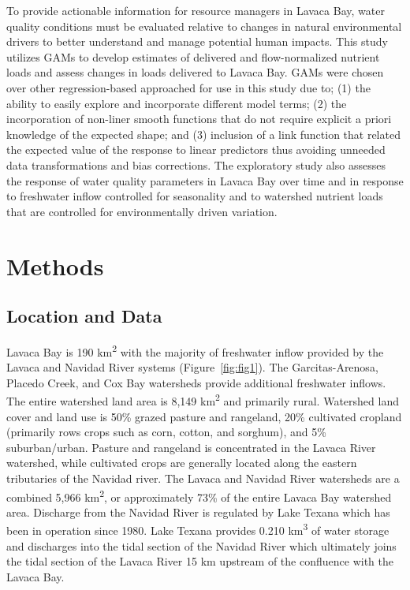 \documentclass[sn-basic,referee,lineno,pdflatex]{sn-jnl}
\begin{document}
To provide actionable information for resource managers in Lavaca Bay,
water quality conditions must be evaluated relative to changes in
natural environmental drivers to better understand and manage potential
human impacts. This study utilizes GAMs to develop estimates of
delivered and flow-normalized nutrient loads and assess changes in loads
delivered to Lavaca Bay. GAMs were chosen over other regression-based
approached for use in this study due to; (1) the ability to easily
explore and incorporate different model terms; (2) the incorporation of
non-liner smooth functions that do not require explicit a priori
knowledge of the expected shape; and (3) inclusion of a link function
that related the expected value of the response to linear predictors
thus avoiding unneeded data transformations and bias corrections. The
exploratory study also assesses the response of water quality parameters
in Lavaca Bay over time and in response to freshwater inflow controlled
for seasonality and to watershed nutrient loads that are controlled for
environmentally driven variation.

\hypertarget{sec2}{%
\section{Methods}\label{sec2}}

\hypertarget{location-and-data}{%
\subsection{Location and Data}\label{location-and-data}}

Lavaca Bay is 190 km\textsuperscript{2} with the majority of freshwater
inflow provided by the Lavaca and Navidad River systems
(Figure~\ref{fig:fig1}). The Garcitas-Arenosa, Placedo Creek, and Cox
Bay watersheds provide additional freshwater inflows. The entire
watershed land area is 8,149 km\textsuperscript{2} and primarily rural.
Watershed land cover and land use is 50\% grazed pasture and rangeland,
20\% cultivated cropland (primarily rows crops such as corn, cotton, and
sorghum), and 5\% suburban/urban. Pasture and rangeland is concentrated
in the Lavaca River watershed, while cultivated crops are generally
located along the eastern tributaries of the Navidad river. The Lavaca
and Navidad River watersheds are a combined 5,966 km\textsuperscript{2},
or approximately 73\% of the entire Lavaca Bay watershed area. Discharge
from the Navidad River is regulated by Lake Texana which has been in
operation since 1980. Lake Texana provides 0.210 km\textsuperscript{3}
of water storage and discharges into the tidal section of the Navidad
River which ultimately joins the tidal section of the Lavaca River 15 km
upstream of the confluence with the Lavaca Bay.
\end{document}
